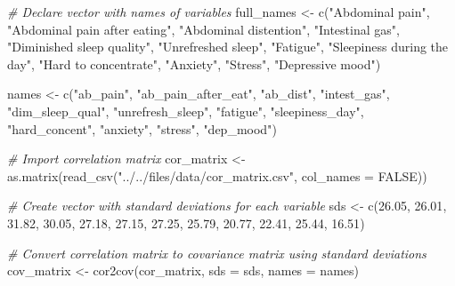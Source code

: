 \documentclass[
  man]{apa6}
\newenvironment{Shaded}{\begin{snugshade}}{\end{snugshade}}
\newcommand{\AttributeTok}[1]{\textcolor[rgb]{0.77,0.63,0.00}{#1}}
\newcommand{\CommentTok}[1]{\textcolor[rgb]{0.56,0.35,0.01}{\textit{#1}}}
\newcommand{\ConstantTok}[1]{\textcolor[rgb]{0.00,0.00,0.00}{#1}}
\newcommand{\FloatTok}[1]{\textcolor[rgb]{0.00,0.00,0.81}{#1}}
\newcommand{\FunctionTok}[1]{\textcolor[rgb]{0.00,0.00,0.00}{#1}}
\newcommand{\NormalTok}[1]{#1}
\newcommand{\OtherTok}[1]{\textcolor[rgb]{0.56,0.35,0.01}{#1}}
\newcommand{\StringTok}[1]{\textcolor[rgb]{0.31,0.60,0.02}{#1}}
\begin{document}
\begin{Shaded}
\begin{Highlighting}[]
\CommentTok{\# Declare vector with names of variables}
\NormalTok{full\_names }\OtherTok{\textless{}{-}} \FunctionTok{c}\NormalTok{(}\StringTok{"Abdominal pain"}\NormalTok{, }\StringTok{"Abdominal pain after eating"}\NormalTok{, }\StringTok{"Abdominal distention"}\NormalTok{,}
    \StringTok{"Intestinal gas"}\NormalTok{, }\StringTok{"Diminished sleep quality"}\NormalTok{, }\StringTok{"Unrefreshed sleep"}\NormalTok{, }\StringTok{"Fatigue"}\NormalTok{,}
    \StringTok{"Sleepiness during the day"}\NormalTok{, }\StringTok{"Hard to concentrate"}\NormalTok{, }\StringTok{"Anxiety"}\NormalTok{, }\StringTok{"Stress"}\NormalTok{, }\StringTok{"Depressive mood"}\NormalTok{)}

\NormalTok{names }\OtherTok{\textless{}{-}} \FunctionTok{c}\NormalTok{(}\StringTok{"ab\_pain"}\NormalTok{, }\StringTok{"ab\_pain\_after\_eat"}\NormalTok{, }\StringTok{"ab\_dist"}\NormalTok{, }\StringTok{"intest\_gas"}\NormalTok{, }\StringTok{"dim\_sleep\_qual"}\NormalTok{,}
    \StringTok{"unrefresh\_sleep"}\NormalTok{, }\StringTok{"fatigue"}\NormalTok{, }\StringTok{"sleepiness\_day"}\NormalTok{, }\StringTok{"hard\_concent"}\NormalTok{, }\StringTok{"anxiety"}\NormalTok{, }\StringTok{"stress"}\NormalTok{,}
    \StringTok{"dep\_mood"}\NormalTok{)}

\CommentTok{\# Import correlation matrix}
\NormalTok{cor\_matrix }\OtherTok{\textless{}{-}} \FunctionTok{as.matrix}\NormalTok{(}\FunctionTok{read\_csv}\NormalTok{(}\StringTok{"../../files/data/cor\_matrix.csv"}\NormalTok{, }\AttributeTok{col\_names =} \ConstantTok{FALSE}\NormalTok{))}

\CommentTok{\# Create vector with standard deviations for each variable}
\NormalTok{sds }\OtherTok{\textless{}{-}} \FunctionTok{c}\NormalTok{(}\FloatTok{26.05}\NormalTok{, }\FloatTok{26.01}\NormalTok{, }\FloatTok{31.82}\NormalTok{, }\FloatTok{30.05}\NormalTok{, }\FloatTok{27.18}\NormalTok{, }\FloatTok{27.15}\NormalTok{, }\FloatTok{27.25}\NormalTok{, }\FloatTok{25.79}\NormalTok{, }\FloatTok{20.77}\NormalTok{, }\FloatTok{22.41}\NormalTok{, }\FloatTok{25.44}\NormalTok{,}
    \FloatTok{16.51}\NormalTok{)}

\CommentTok{\# Convert correlation matrix to covariance matrix using standard deviations}
\NormalTok{cov\_matrix }\OtherTok{\textless{}{-}} \FunctionTok{cor2cov}\NormalTok{(cor\_matrix, }\AttributeTok{sds =}\NormalTok{ sds, }\AttributeTok{names =}\NormalTok{ names)}
\end{Highlighting}
\end{Shaded}
\end{document}
